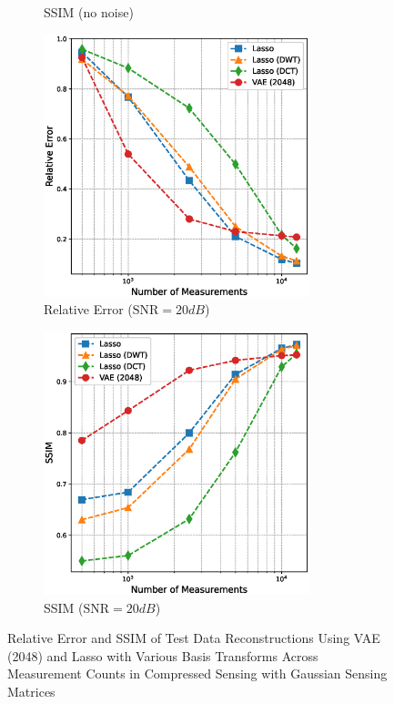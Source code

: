 \begin{figure}[htb]
\begin{subfigure}[b]{0.49\textwidth}
        \caption{SSIM (no noise)}
    \end{subfigure}
    \begin{subfigure}[b]{0.49\textwidth}
        \centering
        \includegraphics[width=0.85\textwidth]{figures/06_results/vae_benchmark/vae_vs_lasso/vae_vs_lasso_relative_error_noisy.eps}
        \caption{Relative Error ($\text{SNR} = 20 \unit{dB}$)}
    \end{subfigure}
    \begin{subfigure}[b]{0.49\textwidth}
        \centering
        \includegraphics[width=0.85\textwidth]{figures/06_results/vae_benchmark/vae_vs_lasso/vae_vs_lasso_ssim_noisy.eps}
        \caption{SSIM ($\text{SNR} = 20 \unit{dB}$)}
    \end{subfigure}
    \caption{Relative Error and SSIM of Test Data Reconstructions Using VAE (2048) and Lasso with Various Basis Transforms Across Measurement Counts in Compressed Sensing with Gaussian Sensing Matrices}
    \label{fig:results_vae_vs_lasso}
\end{figure}

